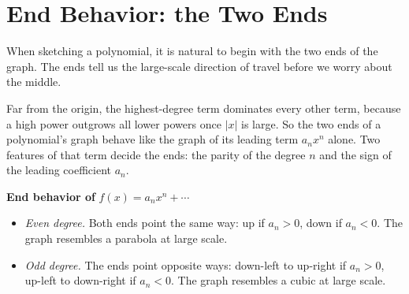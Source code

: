 \documentclass[12pt]{book}
\begin{document}
\section{End Behavior: the Two Ends}

When sketching a polynomial, it is natural to begin with the two ends of the graph.
The ends tell us the large-scale direction of travel before we worry about the
middle.

Far from the origin, the highest-degree term dominates every other term, because a
high power outgrows all lower powers once $|x|$ is large. So the two ends of a
polynomial's graph behave like the graph of its leading term $a_n x^n$ alone. Two
features of that term decide the ends: the parity of the degree $n$ and the sign of
the leading coefficient $a_n$.

\begin{keyidea}
\textbf{End behavior of} $f(x)=a_n x^n+\cdots$
\begin{itemize}\setlength{\itemsep}{2pt}
  \item \emph{Even degree.} Both ends point the same way: up if $a_n>0$, down if
        $a_n<0$. The graph resembles a parabola at large scale.
  \item \emph{Odd degree.} The ends point opposite ways: down-left to up-right if
        $a_n>0$, up-left to down-right if $a_n<0$. The graph resembles a cubic at
        large scale.
\end{itemize}
\end{keyidea}

\begin{center}
\end{center}
\end{document}
